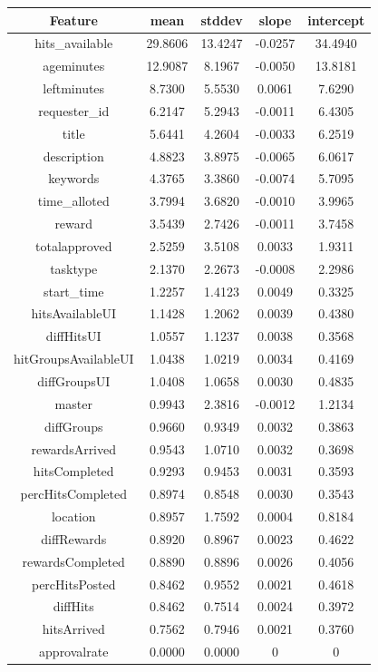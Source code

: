 \begin{table}[ht]
\scriptsize
\begin{tabular}{|c|c|c|c|c|}
\hline
Feature              & mean      & stddev    & slope     & intercept \\
\hline
hits\_available      & 29.8606 & 13.4247 & -0.0257 & 34.4940 \\
ageminutes           & 12.9087 &  8.1967 & -0.0050 & 13.8181 \\
leftminutes          &  8.7300 &  5.5530 & 0.0061 & 7.6290 \\
requester\_id        &  6.2147 &  5.2943 & -0.0011 & 6.4305 \\
title                &  5.6441 &  4.2604 & -0.0033 & 6.2519 \\
description          &  4.8823 &  3.8975 & -0.0065 & 6.0617 \\
keywords             &  4.3765 &  3.3860 & -0.0074 & 5.7095 \\
time\_alloted        &  3.7994 &  3.6820 & -0.0010 & 3.9965 \\
reward               &  3.5439 &  2.7426 & -0.0011 & 3.7458 \\
totalapproved        &  2.5259 &  3.5108 & 0.0033 & 1.9311 \\
tasktype             &  2.1370 &  2.2673 & -0.0008 & 2.2986 \\
start\_time          &  1.2257 &  1.4123 & 0.0049 & 0.3325 \\
hitsAvailableUI      &  1.1428 &  1.2062 & 0.0039 & 0.4380 \\
diffHitsUI           &  1.0557 &  1.1237 & 0.0038 & 0.3568 \\
hitGroupsAvailableUI &  1.0438 &  1.0219 & 0.0034 & 0.4169 \\
diffGroupsUI         &  1.0408 &  1.0658 & 0.0030 & 0.4835 \\
master               &  0.9943 &  2.3816 & -0.0012 & 1.2134 \\
diffGroups           &  0.9660 &  0.9349 & 0.0032 & 0.3863 \\
rewardsArrived       &  0.9543 &  1.0710 & 0.0032 & 0.3698 \\
hitsCompleted        &  0.9293 &  0.9453 & 0.0031 & 0.3593 \\
percHitsCompleted    &  0.8974 &  0.8548 & 0.0030 & 0.3543 \\
location             &  0.8957 &  1.7592 & 0.0004 & 0.8184 \\
diffRewards          &  0.8920 &  0.8967 & 0.0023 & 0.4622 \\
rewardsCompleted     &  0.8890 &  0.8896 & 0.0026 & 0.4056 \\
percHitsPosted       &  0.8462 &  0.9552 & 0.0021 & 0.4618 \\
diffHits             &  0.8462 &  0.7514 & 0.0024 & 0.3972 \\
hitsArrived          &  0.7562 &  0.7946 & 0.0021 & 0.3760 \\
approvalrate         &  0.0000 &  0.0000 & 0 & 0 \\
\hline
\end{tabular}
\end{table}



